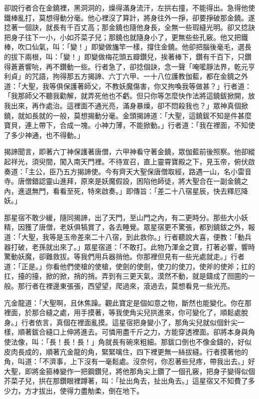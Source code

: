 卻說行者合在金鐃裡，黑洞洞的，燥得滿身流汗，左拱右撞，不能得出。急得他使鐵棒亂打，莫想得動分毫。他心裡沒了算計，將身往外一掙，卻要掙破那金鐃。遂捻著一個訣，就長有千百丈高；那金鐃也隨他身長，全無一些瑕縫光明。卻又捻訣把身子往下一小，小如芥菜子兒；那鐃也就隨身小了，更無些些孔竅。他又把鐵棒，吹口仙氣，叫：「變！」即變做旛竿一樣，撐住金鐃。他卻把腦後毫毛，選長的拔下兩根，叫：「變！」即變做梅花頭五瓣鑽兒，挨著棒下，鑽有千百下，只鑽得蒼蒼響喨，再不鑽動一些。行者急了，卻捻個訣，念一聲「唵㘕靜法界，乾元亨利貞」的咒語，拘得那五方揭諦、六丁六甲、一十八位護教伽藍，都在金鐃之外道：「大聖，我等俱保護著師父，不教妖魔傷害，你又拘喚我等做甚？」行者道：「我那師父不聽我勸解，就弄死他也不虧。但只你等怎麼快作法將這鐃鈸掀開，放我出來，再作處治。這裡面不通光亮，滿身暴燥，卻不悶殺我也？」眾神真個掀鐃，就如長就的一般，莫想揭動分毫。金頭揭諦道：「大聖，這鐃鈸不知是件甚麼寶貝，連上帶下，合成一塊。小神力薄，不能掀動。」行者道：「我在裡面，不知使了多少神通，也不得動。」

揭諦聞言，即著六丁神保護著唐僧，六甲神看守著金鐃，眾伽藍前後照察。他卻縱起祥光，須臾間，闖入南天門裡。不待宣召，直上靈霄寶殿之下，見玉帝，俯伏啟奏道：「主公，臣乃五方揭諦使。今有齊天大聖保唐僧取經，路遇一山，名小雷音寺。唐僧錯認靈山進拜，原來是妖魔假設，困陷他師徒，將大聖合在一副金鐃之內，進退無門，看看至死，特來啟奏。」即傳旨：「差二十八宿星辰，快去釋厄降妖。」

那星宿不敢少緩，隨同揭諦，出了天門，至山門之內，有二更時分。那些大小妖精，因獲了唐僧，老妖俱犒賞了，各去睡覺。眾星宿更不驚張，都到鐃鈸之外，報道：「大聖，我等是玉帝差來二十八宿，到此救你。」行者聽說大喜，便教：「動兵器打破，老孫就出來了。」眾星宿道：「不敢打。此物乃渾金之寶，打著必響，響時驚動妖魔，卻難救拔。等我們用兵器捎他。你那裡但見有一些光處就走。」行者道：「正是。」你看他們使槍的使槍，使劍的使劍，使刀的使刀，使斧的使斧；扛的扛，擡的擡，掀的掀，捎的捎。弄到有三更天氣，漠然不動，就是鑄成了囫圇的一般。那行者在裡邊東張張，西望望，爬過來，滾過去，莫想看見一些光亮。

亢金龍道：「大聖啊，且休焦躁。觀此寶定是個如意之物，斷然也能變化。你在那裡面，於那合縫之處，用手摸著，等我使角尖兒拱進來，你可變化了，順鬆處脫身。」行者依言，真個在裡面亂摸。這星宿把身變小了，那角尖兒就似個針尖一樣，順著鈸合縫口上伸將進去。可憐用盡千斤之力，方能穿透裡面。卻將本身與角使法像，叫：「長！長！長！」角就長有碗來粗細。那鈸口倒也不像金鑄的，好似皮肉長成的，順著亢金龍的角，緊緊噙住，四下裡更無一絲拔縫。行者摸著他的角，叫道：「不濟事，上下沒有一毫鬆處。沒奈何，你忍著些兒疼，帶我出去。」好大聖，即將金箍棒變作一把鋼鑽兒，將他那角尖上鑽了一個孔竅，把身子變得似個芥菜子兒，拱在那鑽眼裡蹲著，叫：「扯出角去，扯出角去。」這星宿又不知費了多少力，方才拔出，使得力盡觔柔，倒在地下。

